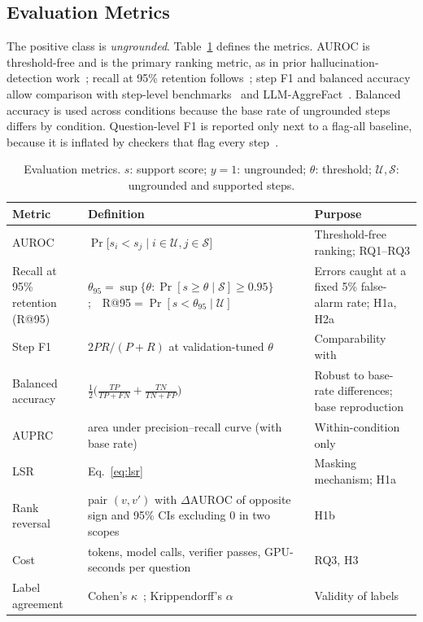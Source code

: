 \documentclass[conference]{IEEEtran}
\begin{document}
\subsection{Evaluation Metrics}
The positive class is \emph{ungrounded}. Table~\ref{tab:metrics} defines the metrics. AUROC is threshold-free and is the primary ranking metric, as in prior hallucination-detection work~\cite{farquhar2024semantic,manakul2023selfcheckgpt}; recall at 95\% retention follows~\cite{chu2026locally}; step F1 and balanced accuracy allow comparison with step-level benchmarks~\cite{ji2026stepgap,pham2026grace} and LLM-AggreFact~\cite{tang2024minicheck}. Balanced accuracy is used across conditions because the base rate of ungrounded steps differs by condition. Question-level F1 is reported only next to a flag-all baseline, because it is inflated by checkers that flag every step~\cite{ji2026stepgap}.

\begin{table}[t]
\caption{Evaluation metrics. $s$: support score; $y=1$: ungrounded; $\theta$: threshold; $\mathcal{U},\mathcal{S}$: ungrounded and supported steps.}\label{tab:metrics}
\centering\footnotesize
\begin{tabular}{@{}p{3.0cm}p{7.6cm}p{5.6cm}@{}}
\toprule
Metric & Definition & Purpose \\
\midrule
AUROC & $\Pr\big[s_i<s_j \mid i\in\mathcal{U}, j\in\mathcal{S}\big]$ & Threshold-free ranking; RQ1--RQ3 \\
Recall at 95\% retention (R@95) & $\theta_{95}=\sup\{\theta:\Pr[s\ge\theta\mid\mathcal{S}]\ge0.95\}$;\ \ R@95$=\Pr[s<\theta_{95}\mid\mathcal{U}]$ & Errors caught at a fixed 5\% false-alarm rate; H1a, H2a \\
Step F1 & $2PR/(P+R)$ at validation-tuned $\theta$ & Comparability with~\cite{ji2026stepgap,pham2026grace} \\
Balanced accuracy & $\tfrac12\big(\tfrac{TP}{TP+FN}+\tfrac{TN}{TN+FP}\big)$ & Robust to base-rate differences; base reproduction \\
AUPRC & area under precision--recall curve (with base rate) & Within-condition only \\
LSR & Eq.~\eqref{eq:lsr} & Masking mechanism; H1a \\
Rank reversal & pair $(v,v')$ with $\Delta\mathrm{AUROC}$ of opposite sign and 95\% CIs excluding 0 in two scopes & H1b \\
Cost & tokens, model calls, verifier passes, GPU-seconds per question & RQ3, H3 \\
Label agreement & Cohen's $\kappa$~\cite{cohen1960kappa}; Krippendorff's $\alpha$~\cite{krippendorff2004content} & Validity of labels \\
\bottomrule
\end{tabular}
\end{table}
\end{document}
